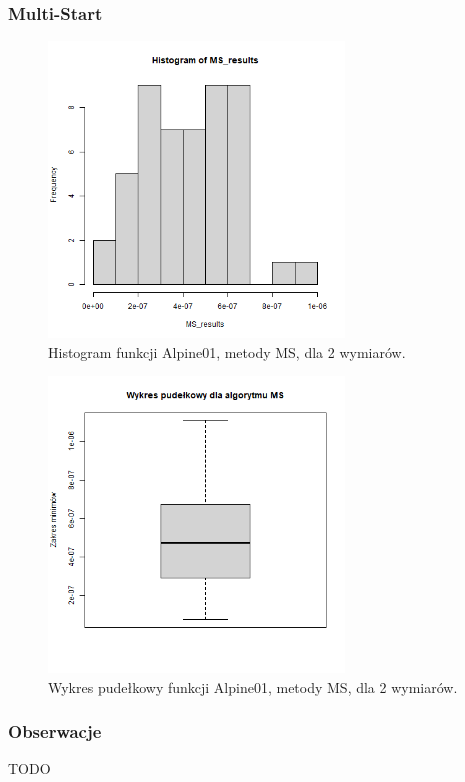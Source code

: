 \documentclass{lab}
\begin{document}
\subsubsection{Multi-Start}
\begin{figure}[H]
  \centering
  \includegraphics[width=0.7\textwidth]{img/dim2_MS_Alpine01_his.png}
  \caption{Histogram funkcji Alpine01, metody MS, dla 2 wymiarów.}
\end{figure}
\begin{figure}[H]
  \centering
  \includegraphics[width=0.7\textwidth]{img/dim2_MS_Alpine01.png}
  \caption{Wykres pudełkowy funkcji Alpine01, metody MS, dla 2 wymiarów.}
\end{figure}

\subsubsection{Obserwacje}
TODO
\end{document}
